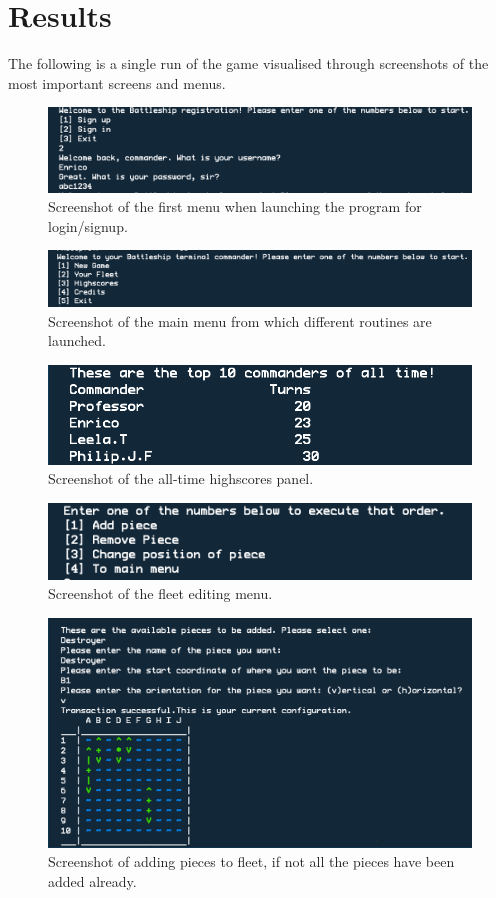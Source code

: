 \documentclass[11pt]{article} %
\begin{document}
\section{Results}
The following is a single run of the game visualised through screenshots of
 the most important screens and menus.
\begin{figure}[H]
\centering
\includegraphics[scale=0.5]{images/login_screen.png}
\caption{Screenshot of the first menu when launching the program for login/signup.}
\end{figure}
\begin{figure}[H]
\centering
\includegraphics[scale=0.5]{images/main_screen.png}
\caption{Screenshot of the main menu from which different routines are launched.}
\end{figure}
\begin{figure}[H]
\centering
\includegraphics[scale=0.5]{images/highscores.png}
\caption{Screenshot of the all-time highscores panel.}
\end{figure}
\begin{figure}[H]
\centering
\includegraphics[scale=0.5]{images/edit_screen.png}
\caption{Screenshot of the fleet editing menu.}
\end{figure}
\begin{figure}[H]
\centering
\includegraphics[scale=0.5]{images/add_piece.png}
\caption{Screenshot of adding pieces to fleet, if not all the pieces have been added already.}
\end{figure}
\end{document}
